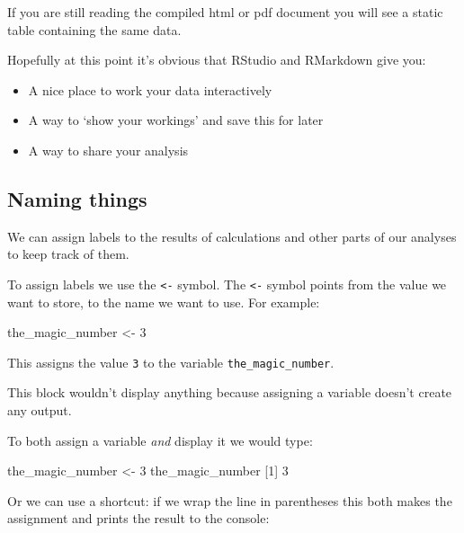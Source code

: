 \documentclass[]{article}
\newenvironment{Shaded}{\begin{snugshade}}{\end{snugshade}}
\newcommand{\DecValTok}[1]{\textcolor[rgb]{0.00,0.00,0.81}{#1}}
\newcommand{\NormalTok}[1]{#1}
\newcommand{\StringTok}[1]{\textcolor[rgb]{0.31,0.60,0.02}{#1}}
\providecommand{\tightlist}{%
  \setlength{\itemsep}{0pt}\setlength{\parskip}{0pt}}
\begin{document}
If you are still reading the compiled html or pdf document you will see a static
table containing the same data.

Hopefully at this point it's obvious that RStudio and RMarkdown give you:

\begin{itemize}
\tightlist
\item
  A nice place to work your data interactively
\item
  A way to `show your workings' and save this for later
\item
  A way to share your analysis
\end{itemize}

\hypertarget{variables}{%
\subsection*{Naming things}\label{variables}}

We can assign labels to the results of calculations and other parts of our
analyses to keep track of them.

To assign labels we use the \texttt{\textless{}-} symbol. The \texttt{\textless{}-} symbol points from the value
we want to store, to the name we want to use. For example:

\begin{Shaded}
\begin{Highlighting}[]
\NormalTok{the_magic_number <-}\StringTok{ }\DecValTok{3}
\end{Highlighting}
\end{Shaded}

This assigns the value \texttt{3} to the variable \texttt{the\_magic\_number}.

This block wouldn't display anything because assigning a variable doesn't create
any output.

To both assign a variable \emph{and} display it we would type:

\begin{Shaded}
\begin{Highlighting}[]
\NormalTok{the_magic_number <-}\StringTok{ }\DecValTok{3}
\NormalTok{the_magic_number}
\NormalTok{[}\DecValTok{1}\NormalTok{] }\DecValTok{3}
\end{Highlighting}
\end{Shaded}

Or we can use a shortcut: if we wrap the line in parentheses this both makes the
assignment and prints the result to the console:
\end{document}
